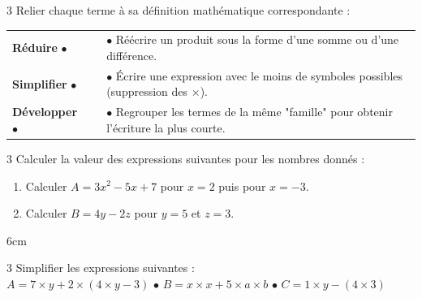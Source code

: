 \documentclass[a4paper]{book}
\begin{document}
{\newpage

\setcounter{exo}{0}
\NomPrenom
{}
\TableauCompetencesTrois
            {}
            {}
            {}


    \begin{exerciceNote}{3}
        Relier chaque terme à sa définition mathématique correspondante :
        
        \medskip
        \begin{tabularx}{\textwidth}{@{}X c X@{}}
            \textbf{Réduire} $\bullet$ & \hspace{2cm} & $\bullet$ Réécrire un produit sous la forme d'une somme ou d'une différence. \\
            \rule{0pt}{1.2cm} 
            \textbf{Simplifier} $\bullet$ & & $\bullet$ Écrire une expression avec le moins de symboles possibles (suppression des $\times$). \\
            \rule{0pt}{1.2cm}
            \textbf{Développer} $\bullet$ & & $\bullet$ Regrouper les termes de la même "famille" pour obtenir l'écriture la plus courte. \\
        \end{tabularx}
        \vspace{0.5cm}
    \end{exerciceNote}
    
    
    \begin{exerciceNote}{3}
        Calculer la valeur des expressions suivantes pour les nombres donnés :
        \begin{enumerate}
            \item Calculer $A = 3x^2 - 5x + 7$ pour $x = 2$ puis pour $x=-3$.
            \item Calculer $B = 4y - 2z$ pour $y = 5$ et $z = 3$.
        \end{enumerate}
        
        \begin{ZoneReponse}{6cm}
        \end{ZoneReponse}
    \end{exerciceNote}
    

    \begin{exerciceNote}{3}
        Simplifier les expressions suivantes : \\
        $A = 7 \times y + 2 \times (4 \times y - 3)$ \hfill $\bullet$ \hfill $B = x \times x + 5 \times a \times b$ \hfill $\bullet$ \hfill $C = 1 \times y - (4 \times 3)$ 
        

\end{exerciceNote}}
\end{document}
